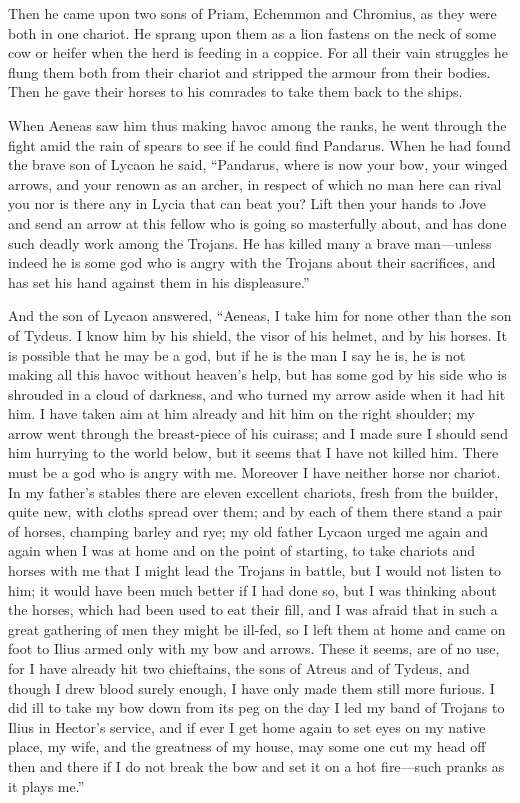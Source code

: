 Then he came upon two sons of Priam, Echemmon and Chromius, as they were
both in one chariot. He sprang upon them as a lion fastens on the neck of
some cow or heifer when the herd is feeding in a coppice. For all their
vain struggles he flung them both from their chariot and stripped the
armour from their bodies. Then he gave their horses to his comrades to
take them back to the ships.

When Aeneas saw him thus making havoc among the ranks, he went through the
fight amid the rain of spears to see if he could find Pandarus. When he
had found the brave son of Lycaon he said, “Pandarus, where is now your
bow, your winged arrows, and your renown as an archer, in respect of which
no man here can rival you nor is there any in Lycia that can beat you?
Lift then your hands to Jove and send an arrow at this fellow who is going
so masterfully about, and has done such deadly work among the Trojans. He
has killed many a brave man—unless indeed he is some god who is
angry with the Trojans about their sacrifices, and has set his hand
against them in his displeasure.”

And the son of Lycaon answered, “Aeneas, I take him for none other than
the son of Tydeus. I know him by his shield, the visor of his helmet, and
by his horses. It is possible that he may be a god, but if he is the man I
say he is, he is not making all this havoc without heaven’s help, but has
some god by his side who is shrouded in a cloud of darkness, and who
turned my arrow aside when it had hit him. I have taken aim at him already
and hit him on the right shoulder; my arrow went through the breast-piece
of his cuirass; and I made sure I should send him hurrying to the world
below, but it seems that I have not killed him. There must be a god who is
angry with me. Moreover I have neither horse nor chariot. In my father’s
stables there are eleven excellent chariots, fresh from the builder, quite
new, with cloths spread over them; and by each of them there stand a pair
of horses, champing barley and rye; my old father Lycaon urged me again
and again when I was at home and on the point of starting, to take
chariots and horses with me that I might lead the Trojans in battle, but I
would not listen to him; it would have been much better if I had done so,
but I was thinking about the horses, which had been used to eat their
fill, and I was afraid that in such a great gathering of men they might be
ill-fed, so I left them at home and came on foot to Ilius armed only with
my bow and arrows. These it seems, are of no use, for I have already hit
two chieftains, the sons of Atreus and of Tydeus, and though I drew blood
surely enough, I have only made them still more furious. I did ill to take
my bow down from its peg on the day I led my band of Trojans to Ilius in
Hector’s service, and if ever I get home again to set eyes on my native
place, my wife, and the greatness of my house, may some one cut my head
off then and there if I do not break the bow and set it on a hot fire—such
pranks as it plays me.”

